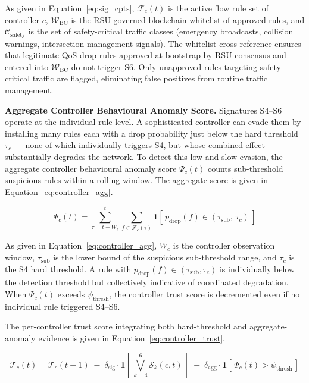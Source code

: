 \documentclass[12pt, a4paper]{report}
\newcommand{\mypar}{\vspace{0.8em}\noindent}
\begin{document}
As given in Equation~\eqref{eq:sig_cpts}, $\mathcal{F}_c(t)$ is
the active flow rule set of controller $c$, $\mathcal{W}_{\text{BC}}$
is the RSU-governed blockchain whitelist of approved rules, and
$\mathcal{C}_{\text{safety}}$ is the set of safety-critical traffic
classes (emergency broadcasts, collision warnings, intersection
management signals). The whitelist cross-reference ensures that
legitimate QoS drop rules approved at bootstrap by RSU consensus
and entered into $\mathcal{W}_{\text{BC}}$ do not trigger S6.
Only unapproved rules targeting safety-critical traffic are flagged,
eliminating false positives from routine traffic management.

\mypar
\textbf{Aggregate Controller Behavioural Anomaly Score.}
Signatures S4--S6 operate at the individual rule level. A
sophisticated controller can evade them by installing many rules
each with a drop probability just below the hard threshold
$\tau_c$ — none of which individually triggers S4, but whose
combined effect substantially degrades the network. To detect
this low-and-slow evasion, the aggregate controller behavioural
anomaly score $\Psi_c(t)$ counts sub-threshold suspicious rules
within a rolling window. The aggregate score is given in
Equation~\eqref{eq:controller_agg}.

\begin{equation}
\label{eq:controller_agg}
\Psi_c(t) =
\sum_{\tau=t-W_c}^{t}
\sum_{f \in \mathcal{F}_c(\tau)}
\mathbf{1}\!\left[\,
p_{\text{drop}}(f) \in (\tau_{\text{sub}},\, \tau_c)
\,\right]
\end{equation}

As given in Equation~\eqref{eq:controller_agg}, $W_c$ is the
controller observation window, $\tau_{\text{sub}}$ is the lower
bound of the suspicious sub-threshold range, and $\tau_c$ is
the S4 hard threshold. A rule with $p_{\text{drop}}(f) \in
(\tau_{\text{sub}}, \tau_c)$ is individually below the detection
threshold but collectively indicative of coordinated degradation.
When $\Psi_c(t)$ exceeds $\psi_{\text{thresh}}$, the controller
trust score is decremented even if no individual rule triggered
S4--S6.

\mypar
The per-controller trust score integrating both hard-threshold and
aggregate-anomaly evidence is given in
Equation~\eqref{eq:controller_trust}.

\begin{equation}
\label{eq:controller_trust}
\mathcal{T}_c(t) = \mathcal{T}_c(t-1)
\;-\;
\delta_{\text{sig}}\cdot
\mathbf{1}\!\left[\,\bigvee_{k=4}^{6}
\mathcal{S}_k(c,t)\,\right]
\;-\;
\delta_{\text{agg}}\cdot
\mathbf{1}\!\left[\,\Psi_c(t)
> \psi_{\text{thresh}}\,\right]
\end{equation}
\end{document}
